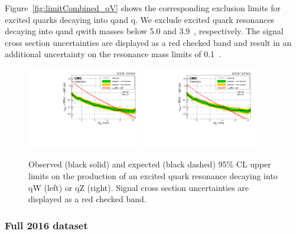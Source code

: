 Figure~\ref{fig:limitCombined_qV} shows the corresponding exclusion limits for excited quarks decaying into q\PW and q\PZ.
We exclude excited quark resonances decaying into q\PW and q\PZ with masses below 5.0 and 3.9~\TeV, respectively.
The signal cross section uncertainties are displayed as a red checked band and result in an additional uncertainty on the resonance mass limits of 0.1~\TeV.
\begin{figure}[h!]
\centering
     \includegraphics[width=0.45\textwidth]{figures/analysis/search2/B2G-16-021/figures/limits/brazilianFlag_qW_new_combined_13TeV.pdf}
     \includegraphics[width=0.45\textwidth]{figures/analysis/search2/B2G-16-021/figures/limits/brazilianFlag_qZ_new_combined_13TeV.pdf}\\
\caption{Observed (black solid) and expected (black dashed) 95\% CL upper limits on the production of an excited quark resonance
decaying into qW (left) or qZ (right). Signal cross section uncertainties are displayed as a red checked band.
}
\label{fig:searchII:limitCombined_qV}
\end{figure}

\subsubsection{Full 2016 dataset}   
\label{sec:searchII:brg17001res}


